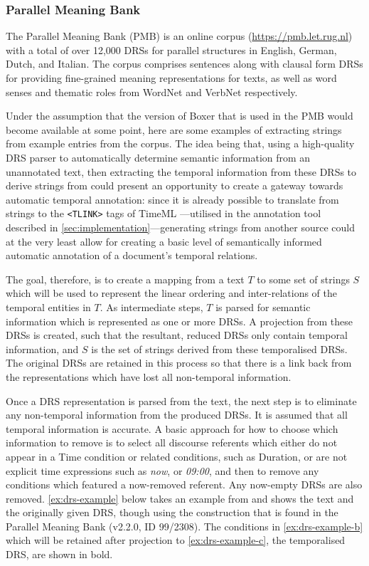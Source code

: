 \documentclass[a4paper,12pt,leqno,twoside]{article}
\begin{document}
\subsubsection{Parallel Meaning Bank}\label{ssub:pmb}
The Parallel Meaning Bank (PMB) is an online corpus (\url{https://pmb.let.rug.nl}) with a total of over 12,000 DRSs for parallel structures in English, German, Dutch, and Italian. The corpus comprises sentences along with clausal form DRSs for providing fine-grained meaning representations for texts, as well as word senses and thematic roles from WordNet \citep{fellbaum2010wordnet} and VerbNet \citep{schuler2005verbnet} respectively.

Under the assumption that the version of Boxer that is used in the PMB would become available at some point, here are some examples of extracting strings from example entries from the corpus. The idea being that, using a high-quality DRS parser to automatically determine semantic information from an unannotated text, then extracting the temporal information from these DRSs to derive strings from could present an opportunity to create a gateway towards automatic temporal annotation: since it is already possible to translate from strings to the \verb|<TLINK>| tags of TimeML \citep{timeml2005timeml}---utilised in the annotation tool described in \cref{sec:implementation}---generating strings from another source could at the very least allow for creating a basic level of semantically informed automatic annotation of a document's temporal relations.

The goal, therefore, is to create a mapping from a text $T$ to some set of strings $S$ which will be used to represent the linear ordering and inter-relations of the temporal entities in $T$. As intermediate steps, $T$ is parsed for semantic information which is represented as one or more DRSs. A projection from these DRSs is created, such that the resultant, reduced DRSs only contain temporal information, and $S$ is the set of strings derived from these temporalised DRSs. The original DRSs are retained in this process so that there is a link back from the representations which have lost all non-temporal information.

Once a DRS representation is parsed from the text, the next step is to eliminate any non-temporal information from the produced DRSs. It is assumed that all temporal information is accurate. A basic approach for how to choose which information to remove is to select all discourse referents which either do not appear in a Time condition or related conditions, such as Duration, or are not explicit time expressions such as \textit{now}, or \textit{09:00}, and then to remove any conditions which featured a now-removed referent. Any now-empty DRSs are also removed. \cref{ex:drs-example} below takes an example from \citet[p. 8]{abzianidze2019first} and shows the text and the originally given DRS, though using the construction that is found in the Parallel Meaning Bank (v2.2.0, ID 99/2308). The conditions in \ref{ex:drs-example-b} which will be retained after projection to \cref{ex:drs-example-c}, the temporalised DRS, are shown in bold.
\end{document}
